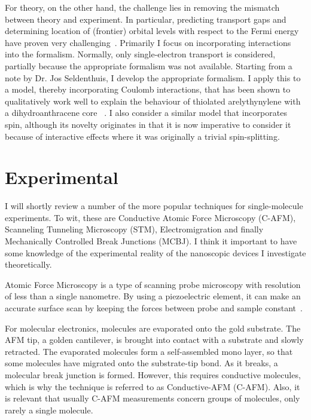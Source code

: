 For theory, on the other hand, the challenge lies in removing the mismatch between theory and experiment. In particular, predicting transport gaps and determining location of (frontier) orbital levels with respect to the Fermi energy have proven very challenging~\cite{perrin}. Primarily I focus on incorporating interactions into the formalism. Normally, only single-electron transport is considered, partially because the appropriate formalism  was not available. Starting from a note by Dr. Jos Seldenthuis, I develop the appropriate formalism. I apply this to a model, thereby incorporating Coulomb interactions, that has been shown to qualitatively work well to explain the behaviour of thiolated arelythynylene with a dihydroanthracene core ~\cite{perrinnano}. I also consider a similar model that incorporates spin, although its novelty originates in that it is now imperative to consider it because of interactive effects where it was originally a trivial spin-splitting. 
\section{Experimental}
I will shortly review a number of the more popular techniques for single-molecule experiments. To wit, these are Conductive Atomic Force Microscopy (C-AFM), Scanneling Tunneling Microscopy (STM), Electromigration and finally Mechanically Controlled Break Junctions (MCBJ). I think it important to have some knowledge of the experimental reality of the nanoscopic devices I investigate theoretically.

Atomic Force Microscopy is a type of scanning probe microscopy with resolution of less than a single nanometre. By using a piezoelectric element, it can make an accurate surface scan by keeping the forces between probe and sample constant~\cite{frei1, frei2}.

For molecular electronics, molecules are evaporated onto the gold substrate. The AFM tip, a golden cantilever, is brought into contact with a substrate and slowly retracted. The evaporated molecules form a self-assembled mono layer, so that some molecules have migrated onto the substrate-tip bond. As it breaks, a molecular break junction is formed. However, this requires conductive molecules, which is why the technique is referred to as Conductive-AFM (C-AFM). Also, it is relevant that usually C-AFM measurements concern groups of molecules, only rarely a single molecule.


